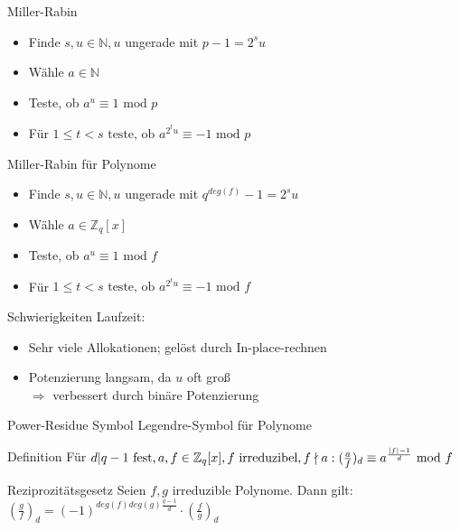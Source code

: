 \documentclass[german,10pt,xcolor=colortbl,compress]{beamer}%
\newcommand{\ZZ}{\mathbb{Z}}
\newcommand{\NN}{\mathbb{N}}
\begin{document}
	\begin{frame}{Miller-Rabin}
		\begin{itemize}
			\item Finde $s,u \in \NN,u $ ungerade mit $p-1=2^su $
			\item Wähle $a \in \NN$ 
			\item Teste, ob $a^u \equiv 1 \text{ mod } p$
			\item Für $1\leq t < s \text{ teste, ob } a^{2^t u} \equiv -1 \text{ mod } p$
		\end{itemize}
	\end{frame}


	\begin{frame}{Miller-Rabin für Polynome}
		\begin{itemize}
			\item Finde $s,u \in \NN,u $ ungerade mit $q^{deg(f)}-1=2^su $
			\item Wähle $a \in \ZZ_q[x]$ 
			\item Teste, ob $a^u \equiv 1 \text{ mod } f$
			\item Für $1\leq t < s \text{ teste, ob } a^{2^t u} \equiv -1 \text{ mod } f$	
		\end{itemize}		
	\end{frame}


	\begin{frame}{Schwierigkeiten}
		Laufzeit: 
		
		\begin{itemize}
			\item Sehr viele Allokationen; gelöst durch In-place-rechnen
			\item Potenzierung langsam, da $u$ oft groß \\
			$\Rightarrow$ verbessert durch binäre Potenzierung
		\end{itemize}
	\end{frame}


	\begin{frame}{Power-Residue Symbol}
		Legendre-Symbol für Polynome 
		\begin{block}{Definition}
			Für $d|q-1 \text{ fest},  a,f \in \ZZ_q[x], f \text{ irreduzibel}, f \nmid a: 
			\newline 	
			(\frac{a}{f})_d  \equiv a^{\frac{|f|-1}{d}} \text{ mod } f$
		\end{block}
	
		\begin{block}{Reziprozitätsgesetz}
			Seien $f,g$ irreduzible Polynome. Dann gilt:
			$(\frac{g}{f})_d=(-1)^{deg(f)deg(g)\frac{q-1}{d}} \cdot (\frac{f}{g})_d $ 				
		\end{block}
	\end{frame}
\end{document}
